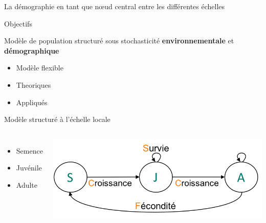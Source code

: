 \documentclass[11pt, compress, aspectratio=1610]{beamer}
\providecommand{\tightlist}{%
  \setlength{\itemsep}{0pt}\setlength{\parskip}{0pt}}
\newcommand{\begincols}{\begin{columns}}
\newcommand{\stopcols}{\end{columns}}
\begin{document}
\begin{frame}{La démographie en tant que nœud central entre les
différentes échelles}
\begin{frame}{Objectifs}
\protect\hypertarget{objectifs-1}{}

\centering

Modèle de population structuré sous stochasticité
\textbf{environnementale} et \textbf{démographique}

\begin{itemize}
\tightlist
\item
  Modèle flexible
\item
  Theoriques
\item
  Appliqués
\end{itemize}

\end{frame}

\begin{frame}{Modèle structuré à l’échelle locale}
\protect\hypertarget{moduxe8le-structuruxe9-uxe0-luxe9chelle-locale}{}

\begincols
{}
  \begin{itemize}
    \item
      {\color{plST}S}emence
    \item
      {\color{plST}J}uvénile
    \item
      {\color{plST}A}dulte
  \end{itemize}

\hfill{}
  \centering

\includegraphics[scale=0.65]{figures/cycle}

\par
\stopcols

\end{frame}

\end{frame}
\end{document}
